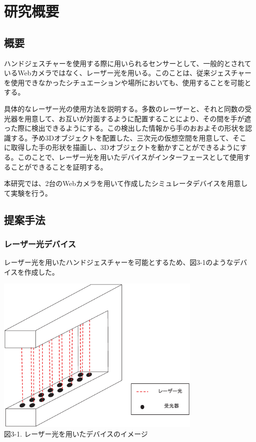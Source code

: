 \section{研究概要}



\subsection{概要}
ハンドジェスチャーを使用する際に用いられるセンサーとして、一般的とされているWebカメラではなく、レーザー光を用いる。このことは、従来ジェスチャーを使用できなかったシチュエーションや場所においても、使用することを可能とする。

具体的なレーザー光の使用方法を説明する。多数のレーザーと、それと同数の受光器を用意して、お互いが対面するように配置することにより、その間を手が遮った際に検出できるようにする。この検出した情報から手のおおよその形状を認識する。予め3Dオブジェクトを配置した、三次元の仮想空間を用意して、そこに取得した手の形状を描画し、3Dオブジェクトを動かすことができるようにする。このことで、レーザー光を用いたデバイスがインターフェースとして使用することができることを証明する。

本研究では、2台のWebカメラを用いて作成したシミュレータデバイスを用意して実験を行う。



\subsection{提案手法}

\subsubsection{レーザー光デバイス}
レーザー光を用いたハンドジェスチャーを可能とするため、図3-1のようなデバイスを作成した。

\begin{center}
  \includegraphics[width=10cm]{RazerDevice_image} \\

 \vspace{1mm}
  図3-1. レーザー光を用いたデバイスのイメージ
\end{center}

